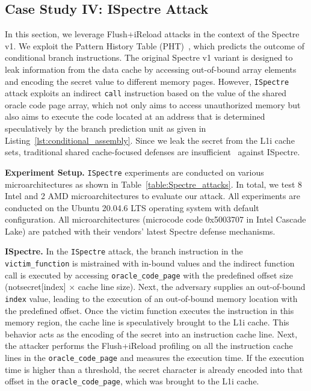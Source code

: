 \subsection{Case Study IV: ISpectre Attack}\label{subsec:case4}
In this section, we leverage Flush+iReload attacks in the context of the Spectre v1. 
We exploit the Pattern History Table (PHT)~\cite{canella2019systematic}, which predicts the outcome of conditional branch instructions.
The original Spectre v1 variant is designed to leak information from the data cache by accessing out-of-bound array elements and encoding the secret value to different memory pages.
However, \texttt{ISpectre} attack exploits an indirect \texttt{call} instruction based on the value of the shared oracle code page array, which not only aims to access unauthorized memory but also aims to execute the code located at an address that is determined speculatively by the branch prediction unit as given in Listing~\ref{lst:conditional_assembly}.
Since we leak the secret from the L1i cache sets, traditional shared cache-focused defenses are insufficient~\cite{ren2021see} against ISpectre.

\noindent\textbf{Experiment Setup.} \texttt{ISpectre} experiments are conducted on various microarchitectures as shown in Table~\ref{table:Spectre_attacks}. In total, we test 8 Intel and 2 AMD microarchitectures to evaluate our attack. All experiments are conducted on the Ubuntu 20.04.6 LTS operating system with default configuration. All microarchitectures (microcode code 0x5003707 in Intel Cascade Lake) are patched with their vendors' latest Spectre defense mechanisms.



\noindent\textbf{ISpectre.} In the \texttt{ISpectre} attack, the branch instruction in the \texttt{victim\_function} is mistrained with in-bound values and the indirect function call is executed by accessing \texttt{oracle\_code\_page} with the predefined offset size (notsecret[index] $\times$ cache line size).  
Next, the adversary supplies an out-of-bound \texttt{index} value, leading to the execution of an out-of-bound memory location with the predefined offset.
Once the victim function executes the instruction in this memory region, the cache line is speculatively brought to the L1i cache.
This behavior acts as the encoding of the secret into an instruction cache line.
Next, the attacker performs the Flush+iReload profiling on all the instruction cache lines in the \texttt{oracle\_code\_page} and measures the execution time.
If the execution time is higher than a threshold, the secret character is already encoded into that offset in the \texttt{oracle\_code\_page}, which was brought to the L1i cache.



